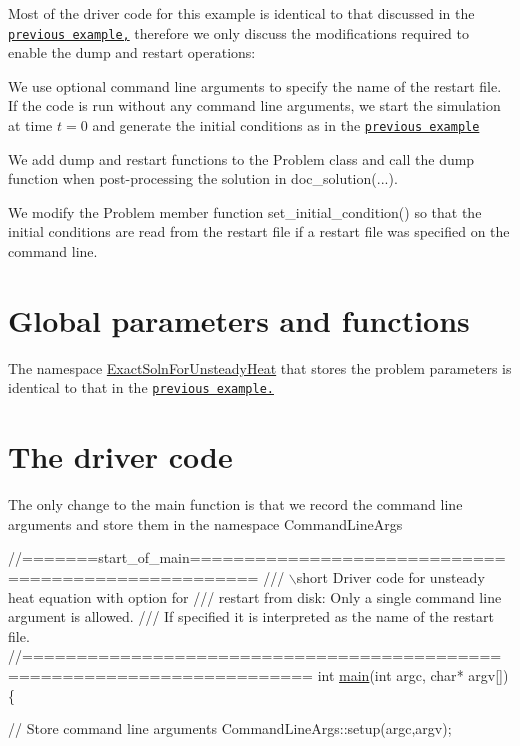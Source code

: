 Most of the driver code for this example is identical to that discussed in the \href{../../two_d_unsteady_heat/html/index.html}{\tt previous example,} therefore we only discuss the modifications required to enable the dump and restart operations\+:
\begin{DoxyItemize}
\item We use optional command line arguments to specify the name of the restart file. If the code is run without any command line arguments, we start the simulation at time $ t=0 $ and generate the initial conditions as in the \href{../../two_d_unsteady_heat/html/index.html}{\tt previous example}
\item We add dump and restart functions to the Problem class and call the dump function when post-\/processing the solution in {\ttfamily doc\+\_\+solution}(...).
\item We modify the Problem member function {\ttfamily set\+\_\+initial\+\_\+condition()} so that the initial conditions are read from the restart file if a restart file was specified on the command line.
\end{DoxyItemize}

 

\hypertarget{index_namespace}{}\section{Global parameters and functions}\label{index_namespace}
The namespace {\ttfamily \hyperlink{namespaceExactSolnForUnsteadyHeat}{Exact\+Soln\+For\+Unsteady\+Heat}} that stores the problem parameters is identical to that in the \href{../../two_d_unsteady_heat/html/index.html}{\tt previous example.}



 

\hypertarget{index_main}{}\section{The driver code}\label{index_main}
The only change to the main function is that we record the command line arguments and store them in the namespace {\ttfamily Command\+Line\+Args} 

 
\begin{DoxyCodeInclude}
\textcolor{comment}{//=======start\_of\_main====================================================}
\textcolor{comment}{/// \(\backslash\)short Driver code for unsteady heat equation with option for}
\textcolor{comment}{}\textcolor{comment}{/// restart from disk: Only a single command line argument is allowed.}
\textcolor{comment}{}\textcolor{comment}{/// If specified it is interpreted as the name of the restart file.}
\textcolor{comment}{}\textcolor{comment}{//========================================================================}
\textcolor{keywordtype}{int} \hyperlink{two__d__unsteady__heat_8cc_ae66f6b31b5ad750f1fe042a706a4e3d4}{main}(\textcolor{keywordtype}{int} argc, \textcolor{keywordtype}{char}* argv[])
\{

 \textcolor{comment}{// Store command line arguments}
 CommandLineArgs::setup(argc,argv);

\end{DoxyCodeInclude}


